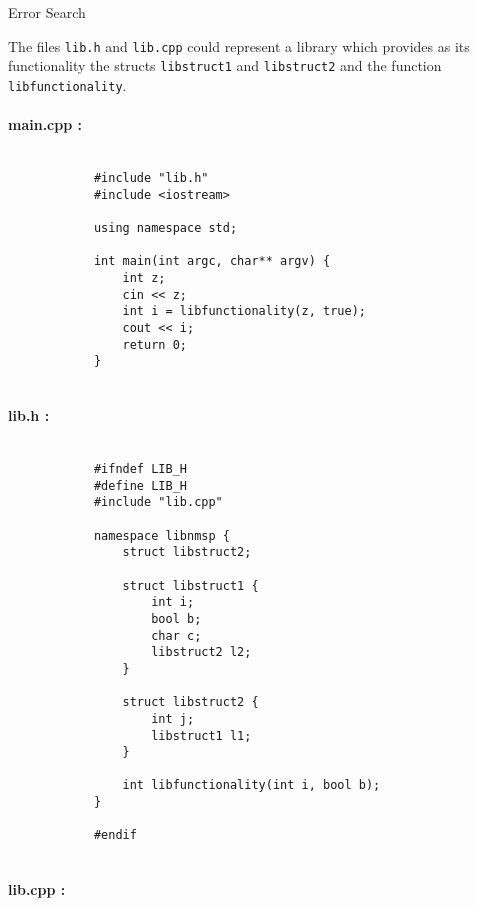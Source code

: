 \documentclass[12pt,a4paper]{scrartcl}
\begin{document}
\begin{aufgabe}[7]{Error Search}

	The files \texttt{lib.h} and \texttt{lib.cpp} could represent a library which provides as its functionality the structs \texttt{libstruct1} and \texttt{libstruct2} and the function \texttt{libfunctionality}. 

	\paragraph*{main.cpp :}
		\phantom{.}
		\begin{lstlisting}[gobble=12] % 3 * tabsize
			
		    #include "lib.h"
            #include <iostream>

            using namespace std;

            int main(int argc, char** argv) {
                int z;
                cin << z;
                int i = libfunctionality(z, true);
                cout << i;
                return 0;
            }
			
		\end{lstlisting}

	\paragraph*{lib.h :}
		\phantom{.}
		\begin{lstlisting}[gobble=12] % 3 * tabsize
			
			#ifndef LIB_H
            #define LIB_H
            #include "lib.cpp"

            namespace libnmsp {
                struct libstruct2;

                struct libstruct1 {
                    int i;
                    bool b;
                    char c;
                    libstruct2 l2;
                }

                struct libstruct2 {
                    int j;
                    libstruct1 l1;
                }

                int libfunctionality(int i, bool b);
            }

            #endif
			
		\end{lstlisting}
		
	\newpage
		
	\paragraph*{lib.cpp :}
		\phantom{.}
		\begin{lstlisting}[gobble=12] % 3 * tabsize
			

\end{lstlisting}
\end{aufgabe}
\end{document}
